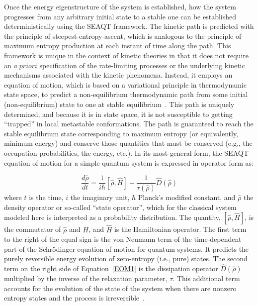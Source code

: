 \documentclass[
journal=jcisd8, %
manuscript=article,
layout=twocolumn   %
]{achemso}
\begin{document}
Once the energy eigenstructure of the system is established, how the system progresses from any arbitrary initial state to a stable one can be established deterministically using the SEAQT framework. The kinetic path is predicted with the principle of steepest-entropy-ascent, which is analogous to the principle of maximum entropy production at each instant of time along the path. This framework is unique in the context of kinetic theories in that it does not require an $a \; priori$ specification of the rate-limiting processes or the underlying kinetic mechanisms associated with the kinetic phenomena. Instead, it employs an equation of motion, which is based on a variational principle in thermodynamic state space, to predict a non-equilibrium thermodynamic path from some initial (non-equilibrium) state to one at stable equilibrium~\cite{Beretta1984, Li2016b, Li2018, Li2018steepest, yamada2019spin,yamada2020kineticpartII}. This path is uniquely determined, and because it is in state space, it is not susceptible to getting ``trapped'' in local metastable conformations.  The path is guaranteed to reach the stable equilibrium state corresponding to maximum entropy (or equivalently, minimum energy) and conserve those quantities that must be conserved (e.g., the occupation probabilities, the energy, etc.). In its most general form, the SEAQT equation of motion for a simple quantum system is expressed in operator form as:

\begin{equation}
\frac {d \hat{\rho}} {dt}=\frac {1} {i \hbar}[\hat{\rho},\hat{H}]+\frac {1} {\tau(\hat{\rho})} {\hat D(\hat{\rho})} \label{EOM1}
\end{equation}
where $t$ is the time, $i$ the imaginary unit, $\hbar$ Planck's modified constant, and $\hat{\rho}$ the density operator or so-called ``state operator'', which for the classical system
modeled here is interpreted as a probability distribution. The quantity, $[\hat{\rho},\hat{H}]$, is the commutator of $\hat{\rho}$ and $\hat{H}$, and $\hat{H}$ is the Hamiltonian operator. The first term to the right of the equal sign is the von Neumann term of the time-dependent part of the Schr\"odinger equation of motion for quantum systems. It predicts the purely reversible energy evolution of zero-entropy (i.e., pure) states. The second term on the right side of Equation~\ref{EOM1} is the dissipation operator $\hat D(\hat{\rho})$ multiplied by the inverse of the relaxation parameter, $\tau$.  This additional term accounts for the evolution of the state of the system when there are nonzero entropy states and the process is irreversible~\cite{Beretta2006, Beretta2009, Li2016d}.
\end{document}
